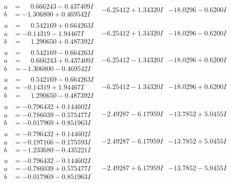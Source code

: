\documentclass[1p]{elsarticle_modified}
\theoremstyle{definition}
\begin{document}
$$\begin{array}{c|c|c}
\begin{aligned}
a &= \phantom{-}0.666243 - 0.437409 I \\
b &= -1.306800 + 0.469542 I\end{aligned}
 & -6.25412 + 1.34320 I & -18.0296 - 0.6200 I \\ \hline\begin{aligned}
u &= \phantom{-}0.542169 + 0.664263 I \\
a &= -0.14319 - 1.94467 I \\
b &= \phantom{-}1.290650 + 0.487392 I\end{aligned}
 & -6.25412 + 1.34320 I & -18.0296 - 0.6200 I \\ \hline\begin{aligned}
u &= \phantom{-}0.542169 - 0.664263 I \\
a &= \phantom{-}0.666243 + 0.437409 I \\
b &= -1.306800 - 0.469542 I\end{aligned}
 & -6.25412 - 1.34320 I & -18.0296 + 0.6200 I \\ \hline\begin{aligned}
u &= \phantom{-}0.542169 - 0.664263 I \\
a &= -0.14319 + 1.94467 I \\
b &= \phantom{-}1.290650 - 0.487392 I\end{aligned}
 & -6.25412 - 1.34320 I & -18.0296 + 0.6200 I \\ \hline\begin{aligned}
u &= -0.796432 + 0.144602 I \\
a &= -0.786039 - 0.575477 I \\
b &= -0.017969 + 0.851963 I\end{aligned}
 & -2.49287 - 6.17959 I & -13.7852 + 5.0455 I \\ \hline\begin{aligned}
u &= -0.796432 + 0.144602 I \\
a &= -0.197166 - 0.175593 I \\
b &= -1.233680 - 0.435221 I\end{aligned}
 & -2.49287 - 6.17959 I & -13.7852 + 5.0455 I \\ \hline\begin{aligned}
u &= -0.796432 - 0.144602 I \\
a &= -0.786039 + 0.575477 I \\
b &= -0.017969 - 0.851963 I\end{aligned}
 & -2.49287 + 6.17959 I & -13.7852 - 5.0455 I \\ \hline\begin{aligned}

\end{aligned}
\end{array}$$
\end{document}
